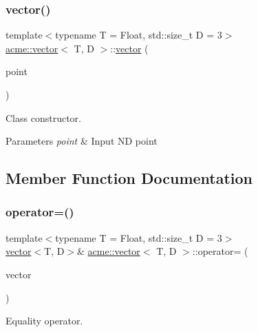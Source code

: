 \subsubsection{\texorpdfstring{vector()}{vector()}\hspace{0.1cm}{\footnotesize\ttfamily [5/5]}}
{\footnotesize\ttfamily template$<$typename T = Float, std\+::size\+\_\+t D = 3$>$ \\
\hyperlink{classacme_1_1vector}{acme\+::vector}$<$ T, D $>$\+::\hyperlink{classacme_1_1vector}{vector} (\begin{DoxyParamCaption}\item[{const \hyperlink{classacme_1_1point}{point}$<$ T, D $>$ \&}]{point }\end{DoxyParamCaption})\hspace{0.3cm}{\ttfamily [inline]}}



Class constructor. 


\begin{DoxyParams}{Parameters}
{\em point} & Input ND point \\
\hline
\end{DoxyParams}


\subsection{Member Function Documentation}
\mbox{\label{classacme_1_1vector_a9bf3091c36ef771c02a22e5aae144952}} 
\subsubsection{\texorpdfstring{operator=()}{operator=()}}
{\footnotesize\ttfamily template$<$typename T = Float, std\+::size\+\_\+t D = 3$>$ \\
\hyperlink{classacme_1_1vector}{vector}$<$T, D$>$\& \hyperlink{classacme_1_1vector}{acme\+::vector}$<$ T, D $>$\+::operator= (\begin{DoxyParamCaption}\item[{const \hyperlink{classacme_1_1vector}{vector}$<$ T, D $>$ \&}]{vector }\end{DoxyParamCaption})\hspace{0.3cm}{\ttfamily [inline]}}



Equality operator. 


